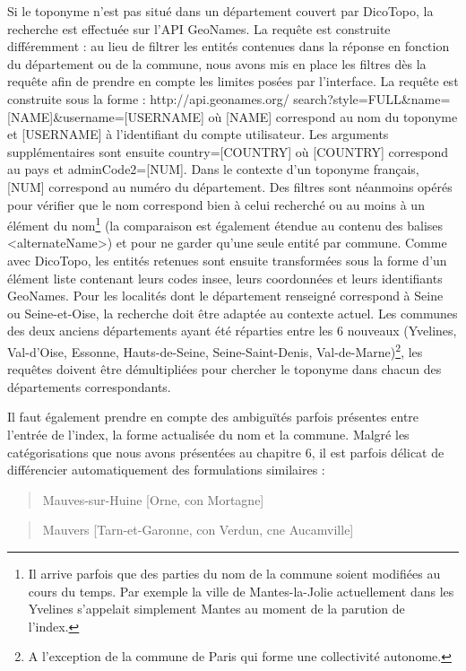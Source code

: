 \documentclass[a4paper,12pt,twoside]{book}
\begin{document}
	Si le toponyme n'est pas situé dans un département couvert par DicoTopo, la recherche est effectuée sur l'API GeoNames. La requête est construite différemment : au lieu de filtrer les entités contenues dans la réponse en fonction du département ou de la commune, nous avons mis en place les filtres dès la requête afin de prendre en compte les limites posées par l'interface. La requête est construite sous la forme : \og http://api.geonames.org/ search?style=FULL\&name=[NAME]\&username=[USERNAME]\fg{} où [NAME] correspond au nom du toponyme et [USERNAME] à l'identifiant du compte utilisateur. Les arguments supplémentaires sont ensuite \og country=[COUNTRY]\fg{} où [COUNTRY] correspond au pays et \og adminCode2=[NUM]\fg{}. Dans le contexte d'un toponyme français, [NUM] correspond au numéro du département. Des filtres sont néanmoins opérés pour vérifier que le nom correspond bien à celui recherché ou au moins à un élément du nom\footnote{Il arrive parfois que des parties du nom de la commune soient modifiées au cours du temps. Par exemple la ville de Mantes-la-Jolie actuellement dans les Yvelines s'appelait simplement Mantes au moment de la parution de l'index.} (la comparaison est également étendue au contenu des balises <alternateName>) et pour ne garder qu'une seule entité par commune. Comme avec DicoTopo, les entités retenues sont ensuite transformées sous la forme d'un élément liste contenant leurs codes insee, leurs coordonnées et leurs identifiants GeoNames. Pour les localités dont le département renseigné correspond à \og Seine\fg{} ou \og Seine-et-Oise\fg{}, la recherche doit être adaptée au contexte actuel. Les communes des deux anciens départements ayant été réparties entre les 6 nouveaux (Yvelines, Val-d'Oise, Essonne, Hauts-de-Seine, Seine-Saint-Denis, Val-de-Marne)\footnote{A l'exception de la commune de Paris qui forme une collectivité autonome.}, les requêtes doivent être démultipliées pour chercher le toponyme dans chacun des départements correspondants.
	
	Il faut également prendre en compte des ambiguïtés parfois présentes entre l'entrée de l'index, la forme actualisée du nom et la commune. Malgré les catégorisations que nous avons présentées au chapitre 6, il est parfois délicat de différencier automatiquement des formulations similaires :
	
	\begin{quotation}
		Mauves-sur-Huine [Orne, con Mortagne]
	\end{quotation}

	\begin{quotation}
		Mauvers [Tarn-et-Garonne, con Verdun, cne Aucamville]
	\end{quotation}
\end{document}
